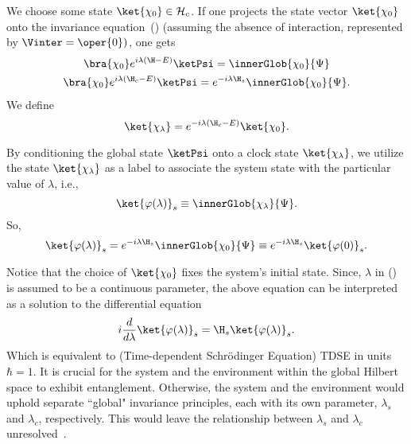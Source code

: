 We choose some state \(\ket{\chi_0} \in \mathcal{H}_c\). If one projects the state vector \(\ket{\chi_0}\) onto the invariance equation~() (assuming the absence of interaction, represented by \(\Vinter = \oper{0})\), one gets
\begin{equation}
\begin{gathered}
\bra{\chi_0}e^{i\lambda(\H - E)}\ketPsi = \innerGlob{\chi_0}{\Psi}\\
\bra{\chi_0}e^{i\lambda(\H_c - E)}\ketPsi =e^{-i\lambda \H_s}  \innerGlob{\chi_0}{\Psi}.
\end{gathered}
\end{equation}
We define
\begin{equation}
   \ket{\chi_\lambda} = e^{-i\lambda(\H_c - E)}\ket{\chi_0}.
\end{equation}

By conditioning the global state \(\ketPsi\) onto a clock state \(\ket{\chi_\lambda}\),
we utilize the state \(\ket{\chi_\lambda}\) as a label to associate the system state with the particular value of \(\lambda\), i.e., 
\begin{equation}
    \label{eq:nonint_sys_evol}
    \ket{\varphi(\lambda)}_s \equiv \innerGlob{\chi_\lambda}{\Psi}.
\end{equation}
So, 
\begin{equation}
\label{eq:nonint_sys_evol2}
    \ket{\varphi(\lambda)}_s = e^{-i\lambda \H_s} \innerGlob{\chi_0}{\Psi} \equiv e^{-i\lambda \H_s}\ket{\varphi(0)}_s.
\end{equation}

Notice that the choice of \(\ket{\chi_0}\) fixes the system's initial state.
Since, \(\lambda\) in () is assumed to be a continuous 
 parameter, the above equation can be interpreted as a solution to the differential equation
\begin{equation}
    i \dfrac{d}{d\lambda} \ket{\varphi(\lambda)}_s = \H_s \ket{\varphi(\lambda)}_s.
\end{equation}
Which is equivalent to (Time-dependent Schr\"odinger Equation) TDSE in units 
\(\hbar = 1\). It is crucial for the system and the environment within the global Hilbert space to exhibit entanglement. Otherwise, the system and the environment would uphold separate ``global" invariance principles, each with its own parameter, \(\lambda_s\) and \(\lambda_c\), respectively. This would leave the relationship between \(\lambda_s\) and \(\lambda_c\) unresolved~\cite{Gemsheim:2023izg}.

